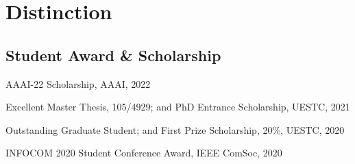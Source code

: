 \section*{Distinction}


\subsection*{\hspace{1.6em}Student Award \& Scholarship}
\indent

AAAI-22 Scholarship, AAAI, 2022

Excellent Master Thesis, 105/4929; and PhD Entrance Scholarship, UESTC, 2021

Outstanding Graduate Student; and First Prize Scholarship, 20\%, UESTC, 2020


INFOCOM 2020 Student Conference Award, IEEE ComSoc, 2020

